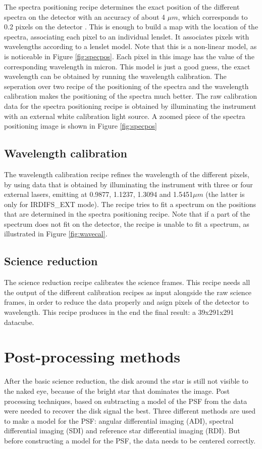 \documentclass[twoside,single,12pt]{lion-msc}
\begin{document}
The spectra positioning recipe determines the exact position of the different spectra on the detector with an accuracy of about 4 $\mu m$, which corresponds to 0.2 pixels on the detector \citep{Desidera2008}. This is enough to build a map with the location of the spectra, associating each pixel to an individual lenslet. It associates pixels with wavelengths according to a lenslet model. Note that this is a non-linear model, as is noticeable in Figure \ref{fig:specpos}. Each pixel in this image has the value of the corresponding wavelength in micron. This model is just a good guess, the exact wavelength can be obtained by running the wavelength calibration. The seperation over two recipe of the positioning of the spectra and the wavelength calibration makes the positioning of the spectra much better. The raw calibration data for the spectra positioning recipe is obtained by illuminating the instrument with an external white calibration light source. A zoomed piece of the spectra positioning image is shown in Figure \ref{fig:specpos}

\subsection{Wavelength calibration}
The wavelength calibration recipe refines the wavelength of the different pixels, by using data that is obtained by illuminating the instrument with three or four external lasers, emitting at 0.9877, 1.1237, 1.3094 and 1.5451$\mu m$ (the latter is only for IRDIFS\_EXT mode).  The recipe tries to fit a spectrum on the positions that are determined in the spectra positioning recipe. Note that if a part of the spectrum does not fit on the detector, the recipe is unable to fit a spectrum, as illustrated in Figure \ref{fig:wavecal}.

\subsection{Science reduction}
The science reduction recipe calibrates the science frames. This recipe needs all the output of the different calibration recipes as input alongside the raw science frames, in order to reduce the data properly and asign pixels of the detector to wavelength. This recipe produces in the end the final result: a 39x291x291 datacube.

\section{Post-processing methods}
After the basic science reduction, the disk around the star is still not visible to the naked eye, because of the bright star that dominates the image. Post processing techniques, based on subtracting a model of the PSF from the data were needed to recover the disk signal the best. Three different methods are used to make a model for the PSF: angular differential imaging (ADI), spectral differential imaging (SDI) and reference star differential imaging (RDI). But before constructing a model for the PSF, the data needs to be centered correctly.
\end{document}
